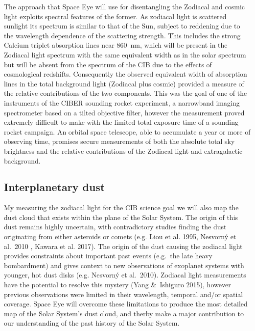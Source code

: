 \documentclass[]{iac}
\begin{document}
The approach that Space Eye will use for disentangling the Zodiacal and cosmic light exploits spectral features of the
former. As zodiacal light is scattered sunlight its spectrum is similar to that of the Sun, subject to reddening due to
the wavelength dependence of the scattering strength\cite{Giavalisco2002,Aldering2001,Leinert1998}. This includes the
strong Calcium triplet absorption lines near \SI{860}{\nano\metre}, which will be present in the Zodiacal light
spectrum with the same equivalent width as in the solar spectrum but will be absent from the spectrum of the
CIB due to the effects of cosmological redshifts. Consequently the observed equivalent width of
absorption lines in the total background light (Zodiacal plus cosmic) provided a measure of the relative contributions
of the two components. This was the goal of one of the instruments of the CIBER sounding rocket
experiment\cite{Zemcov2013}, a narrowband imaging spectrometer based on a tilted objective filter\cite{Korngut2013},
however the measurement proved extremely difficult to make with the limited total exposure time of a sounding rocket
campaign. An orbital space telescope, able to accumulate a year or more of observing time, promises secure measurements
of both the absolute total sky brightness and the relative contributions of the Zodiacal light and extragalactic
background.

\subsection{Interplanetary dust}

My measuring the zodiacal light for the CIB science goal we will also map the dust cloud that exists within the plane
of the Solar System. The origin of this dust remains highly uncertain, with contradictory studies finding the dust
originating from either asteroids or comets (e.g. Liou et al. 1995\cite{Liou1995}, Nesvorn\'y et al.\ 2010
\cite{Nesvorny2010}, Kawara et al. 2017\cite{Kawara2017}). The origin of the dust causing the zodiacal light provides
constraints about important past events (e.g.\ the late heavy bombardment) and gives context to new observations of
exoplanet systems with younger, hot dust disks (e.g. Nesvorn\'y et al.\ 2010\cite{Nesvorny2010}). Zodiacal light
measurements have the potential to resolve this mystery (Yang \&\ Ishiguro 2015\cite{Yang2015}), however previous
observations were limited in their wavelength, temporal and/or spatial coverage. Space Eye will overcome these
limitations to produce the most detailed map of the Solar System's dust cloud, and therby make a major contribution to
our understanding of the past history of the Solar System.
\end{document}
